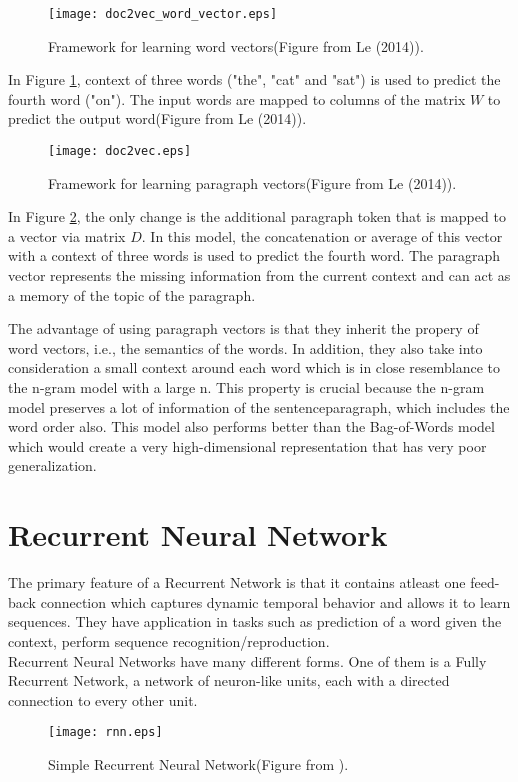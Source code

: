 \begin{figure}[ht!]
\centering
\texttt{[image: doc2vec\_word\_vector.eps]}
\caption{Framework for learning word vectors(Figure from Le (2014)). \label{fig:word2vec}}
\end{figure}
In Figure \ref{fig:word2vec}, context  of three words ("the", "cat" and "sat") is used to predict the fourth word ("on"). The input words are mapped to columns of the matrix $W$ to predict the output word(Figure from Le (2014)).

\begin{figure}[ht!]
\centering
\texttt{[image: doc2vec.eps]}
\caption{Framework for learning paragraph vectors(Figure from Le (2014)). \label{fig:doc2vec}}
\end{figure}
In Figure \ref{fig:doc2vec}, the only change is the additional paragraph token that is mapped to a vector via matrix $D$. In this model, the concatenation or average of this vector with a context of three words is used to predict the fourth word. The paragraph vector represents the missing information from the current context and can act as a memory of the topic of the paragraph.

The advantage of using paragraph vectors is that they inherit the propery of word vectors, i.e., the semantics of the words. In addition, they also take into consideration a small context around each word which is in close resemblance to the n-gram model with a large n. This property is crucial because the n-gram model preserves a lot of information of the sentence\/paragraph, which includes the word order also. This model also performs better than the Bag-of-Words model which would create a very high-dimensional representation that has very poor generalization.

\section{Recurrent Neural Network}
\label{sec:rnn}
The primary feature of a Recurrent Network is that it contains atleast one feed-back connection which captures dynamic temporal behavior and allows it to learn sequences. They have application in tasks such as prediction of a word given the context, perform sequence recognition/reproduction.\\
Recurrent Neural Networks have many different forms. One of them is a Fully Recurrent Network, a network of neuron-like units, each with a directed connection to every other unit.\\
\begin{figure}[ht!]
\centering
\texttt{[image: rnn.eps]}
\caption{Simple Recurrent Neural Network(Figure from \cite{Mikolov:10}). \label{fig:rnn}}
\end{figure}

